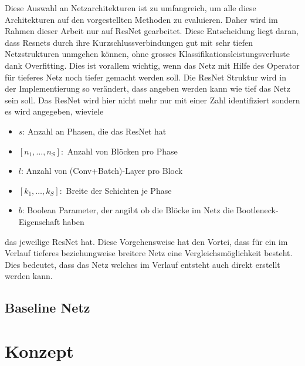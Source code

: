 Diese Auswahl an Netzarchitekturen ist zu umfangreich, um alle diese Architekturen auf den vorgestellten Methoden zu evaluieren. Daher wird im Rahmen dieser Arbeit nur auf ResNet gearbeitet. Diese Entscheidung liegt daran, dass Resnets durch ihre Kurzschlussverbindungen gut mit sehr tiefen Netzstrukturen unmgehen können, ohne grosses Klassifikationsleistungsverluste dank Overfitting. Dies ist vorallem wichtig, wenn das Netz mit Hilfe des Operator für tieferes Netz noch tiefer gemacht werden soll. Die ResNet Struktur wird in der Implementierung so verändert, dass angeben werden kann wie tief das Netz sein soll. Das ResNet wird hier nicht mehr nur mit einer Zahl identifiziert sondern es wird angegeben, wieviele
\begin{itemize}
 \item $s$: Anzahl an Phasen, die das ResNet hat
 \item $[n_1, \ldots, n_S]:$ Anzahl von Blöcken pro Phase 
 \item $l$: Anzahl von (Conv+Batch)-Layer pro Block
 \item $[k_1, \ldots,k_S ]:$ Breite der Schichten je Phase
 \item $b$: Boolean Parameter, der angibt ob die Blöcke im Netz die Bootleneck-Eigenschaft haben
\end{itemize}
das jeweilige ResNet hat. Diese Vorgehensweise hat den Vortei, dass für ein im Verlauf tieferes beziehungweise breitere Netz eine Vergleichsmöglichkeit besteht. Dies bedeutet, dass das Netz welches im Verlauf entsteht auch direkt erstellt werden kann.



\subsection{Baseline Netz}


\section{Konzept}
